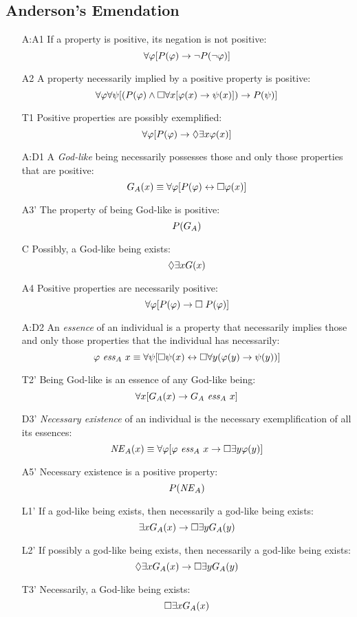 \documentclass{birkjour}
\theoremstyle{definition}
\theoremstyle{remark}
\numberwithin{equation}{section}
\begin{document}
\begin{appendix}
\section{Anderson's Emendation} \label{apx:Anderson}


\begin{itemize}
\item[A:A1] If a property is positive, its negation is not positive:
  $$\forall \varphi [P(\varphi) \rightarrow \neg P(\neg \varphi)]$$ 
\item[A2] A property necessarily implied by a
  positive property is positive:
  $$\forall \varphi \forall \psi [(P(\varphi) \wedge \Box \forall x [\varphi(x)
  \rightarrow \psi(x)]) \rightarrow P(\psi)]$$
\item[T1] Positive properties are possibly exemplified: 
  $$\forall \varphi [P(\varphi) \rightarrow \Diamond \exists x \varphi(x)]$$ 
\item[A:D1] A \emph{God-like} being necessarily possesses those and only those properties that are positive: 
  $$G_A(x) \equiv \forall \varphi [P(\varphi) \leftrightarrow \Box \varphi(x)]$$ 
\item[A3']  The property of being God-like is positive: 
  $$P(G_A)$$
\item[C\phantom{1}] Possibly, a God-like being exists: $$\Diamond \exists x G(x)$$
\item[A4]  Positive properties are necessarily positive: 
  $$\forall \varphi [P(\varphi) \rightarrow \Box \; P(\varphi)]$$ 
\item[A:D2] An \emph{essence} of an individual is a property that necessarily implies those and only those properties that the individual has necessarily: $$\varphi \ \mathit{ess}_A \ x \equiv \forall
  \psi [\Box \psi(x) \leftrightarrow \Box \forall y (\varphi(y) \rightarrow \psi(y))]$$ 
\item[T2']  Being God-like is an essence of any
  God-like being: $$\forall x [G_A(x) \rightarrow G_A \ \mathit{ess}_A \ x]$$
\item[D3'] \emph{Necessary existence} of an individual is the necessary exemplification of all its essences: 
  $$\mathit{NE}_A(x) \equiv \forall \varphi [\varphi \ \mathit{ess}_A \ x \rightarrow \Box
  \exists y \varphi(y)]$$
\item[A5'] Necessary existence is a positive property: $$P(\mathit{NE}_A)$$ 
\item[L1'] If a god-like being exists, then necessarily a god-like being exists: 
  $$\exists x G_A(x) \rightarrow \Box \exists y G_A(y)$$
\item[L2'] If possibly a god-like being exists, then necessarily a god-like being exists: 
  $$\Diamond \exists x G_A(x) \rightarrow \Box \exists y G_A(y) $$
%
\item[T3'] Necessarily, a God-like being exists: $$\Box \exists x G_A(x)$$ 
\end{itemize}



\end{appendix}
\end{document}
